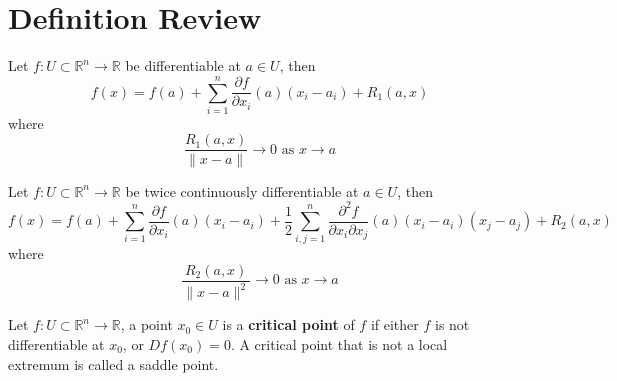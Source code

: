 \documentclass[openany]{book}
\newcommand{\R}{\mathbb{R}}
\begin{document}
\chapter{Definition Review}

\begin{defn}
    Let $f:U\subset\R^n\to\R$ be differentiable at $a\in U$, then 
    \begin{equation*}
        f(x)=f(a)+\sum_{i=1}^n\frac{\partial f}{\partial x_i}(a)(x_i-a_i)+R_1(a,x)
    \end{equation*}
    where 
    \begin{equation*}
        \frac{R_1(a,x)}{\|x-a\|}\to 0 \text{ as } x\to a
    \end{equation*}
\end{defn}

\begin{defn}\label{taylor}
    Let $f:U\subset\R^n\to\R$ be twice continuously differentiable at $a\in U$, then 
    \begin{equation*}
        f(x)=f(a)+\sum_{i=1}^n\frac{\partial f}{\partial x_i}(a)(x_i-a_i)+\frac{1}{2}\sum_{i,j=1}^n\frac{\partial^2 f}{\partial x_i\partial x_j}(a)(x_i-a_i)(x_j-a_j)+R_2(a,x)
    \end{equation*}
    where 
    \begin{equation*}
        \frac{R_2(a,x)}{\|x-a\|^2}\to 0 \text{ as } x\to a
    \end{equation*}
\end{defn}

















\begin{defn}
    Let $f:U\subset\R^n\to\R$, a point $x_0\in U$ is a \textbf{critical point} of $f$ if either $f$ is not differentiable at $x_0$, or $Df(x_0)=0$. A critical point that is not a local extremum is called a saddle point.
\end{defn}
\end{document}
